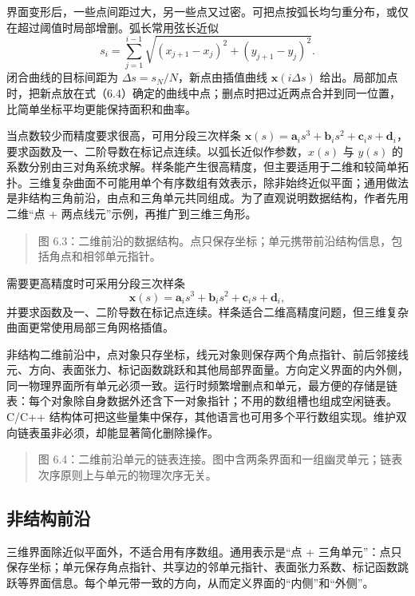 \documentclass[11pt,a4paper,openany,fontset=none]{ctexbook}
\begin{document}
界面变形后，一些点间距过大，另一些点又过密。可把点按弧长均匀重分布，或仅在超过阈值时局部增删。弧长常用弦长近似
\begin{equation}
s_i=\sum_{j=1}^{i-1}
\sqrt{(x_{j+1}-x_j)^2+(y_{j+1}-y_j)^2}.
\tag{6.6}
\end{equation}
闭合曲线的目标间距为 $\Delta s=s_N/N$，新点由插值曲线 $\bm x(i\Delta s)$ 给出。局部加点时，把新点放在式（6.4）确定的曲线中点；删点时把过近两点合并到同一位置，比简单坐标平均更能保持面积和曲率。

当点数较少而精度要求很高，可用分段三次样条 $\bm x(s)=\bm a_is^3+\bm b_is^2+\bm c_is+\bm d_i$，要求函数及一、二阶导数在标记点连续。以弧长近似作参数，$x(s)$ 与 $y(s)$ 的系数分别由三对角系统求解。样条能产生很高精度，但主要适用于二维和较简单拓扑。三维复杂曲面不可能用单个有序数组有效表示，除非始终近似平面；通用做法是非结构三角前沿，由点和三角单元共同组成。为了直观说明数据结构，作者先用二维“点 + 两点线元”示例，再推广到三维三角形。

\begin{quote}\small 图 6.3：二维前沿的数据结构。点只保存坐标；单元携带前沿结构信息，包括角点和相邻单元指针。\end{quote}
需要更高精度时可采用分段三次样条
\begin{equation}
\bm x(s)=\bm a_i s^3+\bm b_i s^2+\bm c_i s+\bm d_i,
\tag{6.7}
\end{equation}
并要求函数及一、二阶导数在标记点连续。样条适合二维高精度问题，但三维复杂曲面更常使用局部三角网格插值。

非结构二维前沿中，点对象只存坐标，线元对象则保存两个角点指针、前后邻接线元、方向、表面张力、标记函数跳跃和其他局部界面量。方向定义界面的内外侧，同一物理界面所有单元必须一致。运行时频繁增删点和单元，最方便的存储是链表：每个对象除自身数据外还含下一对象指针；不用的数组槽也组成空闲链表。C/C++ 结构体可把这些量集中保存，其他语言也可用多个平行数组实现。维护双向链表虽非必须，却能显著简化删除操作。

\begin{quote}\small 图 6.4：二维前沿单元的链表连接。图中含两条界面和一组幽灵单元；链表次序原则上与单元的物理次序无关。\end{quote}
\subsection{非结构前沿}

三维界面除近似平面外，不适合用有序数组。通用表示是“点 + 三角单元”：点只保存坐标；单元保存角点指针、共享边的邻单元指针、表面张力系数、标记函数跳跃等界面信息。每个单元带一致的方向，从而定义界面的“内侧”和“外侧”。
\end{document}
